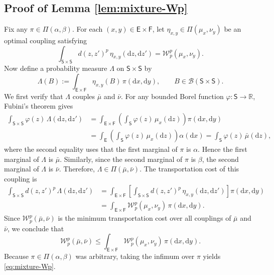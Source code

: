 \documentclass[11pt,letterpaper]{article}
\theoremstyle{plain}
\theoremstyle{definition}
\theoremstyle{remark}
\newcommand{\R}{\mathbb{R}}
\begin{document}
\subsection{Proof of Lemma \ref{lem:mixture-Wp}}\label{sec:proof-mixture-Wp}
Fix any $\pi\in\Pi(\alpha,\beta)$.  For each $(x,y)\in\mathsf E\times\mathsf F$, let
$\eta_{x,y}\in\Pi(\mu_x,\nu_y)$ be an optimal coupling satisfying
\[
    \int_{\mathsf S\times\mathsf S}
    d(z,z')^p\,
    \eta_{x,y}(\mathrm dz,\mathrm dz')
    =
    \mathcal W_p^p(\mu_x,\nu_y).
\]
Now define a probability measure $\Lambda$ on
$\mathsf S\times\mathsf S$ by
\[
    \Lambda(B)
    :=
    \int_{\mathsf E\times\mathsf F}
    \eta_{x,y}(B)\,
    \pi(\mathrm dx,\mathrm dy),
    \qquad
    B\in\mathcal B(\mathsf S\times\mathsf S).
\]
We first verify that $\Lambda$ couples $\bar\mu$ and $\bar\nu$.
For any bounded Borel function $\varphi:\mathsf S\to\R$, Fubini's theorem
gives
\begin{align*}
    \int_{\mathsf S\times\mathsf S}
    \varphi(z)\,
    \Lambda(\mathrm dz,\mathrm dz')
    &=
    \int_{\mathsf E\times\mathsf F}
    \left(
        \int_{\mathsf S}
        \varphi(z)\,\mu_x(\mathrm dz)
    \right)
    \pi(\mathrm dx,\mathrm dy) \\
    &=
    \int_{\mathsf E}
    \left(
        \int_{\mathsf S}
        \varphi(z)\,\mu_x(\mathrm dz)
    \right)
    \alpha(\mathrm dx) =
    \int_{\mathsf S}\varphi(z)\,\bar\mu(\mathrm dz),
\end{align*}
where the second equality uses that the first marginal of $\pi$ is
$\alpha$. Hence the first marginal of $\Lambda$ is $\bar\mu$.
Similarly, since the second marginal of $\pi$ is $\beta$, the second
marginal of $\Lambda$ is $\bar\nu$. Therefore, $ \Lambda\in\Pi(\bar\mu,\bar\nu).$ The transportation cost of this coupling is
\begin{align*}
    \int_{\mathsf S\times\mathsf S}
    d(z,z')^p\,
    \Lambda(\mathrm dz,\mathrm dz')
    &=
    \int_{\mathsf E\times\mathsf F}
    \left[
        \int_{\mathsf S\times\mathsf S}
        d(z,z')^p\,
        \eta_{x,y}(\mathrm dz,\mathrm dz')
    \right]
    \pi(\mathrm dx,\mathrm dy) \\
    &=
    \int_{\mathsf E\times\mathsf F}
    \mathcal W_p^p(\mu_x,\nu_y)\,
    \pi(\mathrm dx,\mathrm dy).
\end{align*}
Since $\mathcal W_p^p(\bar\mu,\bar\nu)$ is the minimum transportation cost
over all couplings of $\bar\mu$ and $\bar\nu$, we conclude that
\[
    \mathcal W_p^p(\bar\mu,\bar\nu)
    \leq
    \int_{\mathsf E\times\mathsf F}
    \mathcal W_p^p(\mu_x,\nu_y)\,
    \pi(\mathrm dx,\mathrm dy).
\]
Because $\pi\in\Pi(\alpha,\beta)$ was arbitrary, taking the infimum over
$\pi$ yields \eqref{eq:mixture-Wp}.
\end{document}
